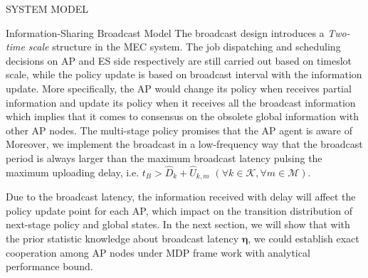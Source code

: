 \documentclass[10pt, conference, letterpaper]{IEEEtran}
\newcommand{\vecG}{\boldsymbol}
\newcommand{\apSet}{\mathcal{K}}
\newcommand{\esSet}{\mathcal{M}}
\begin{document}
\begin{section}{SYSTEM MODEL}
\begin{subsection}{Information-Sharing Broadcast Model}
            The broadcast design introduces a \emph{Two-time scale} structure in the MEC system.
            The job dispatching and scheduling decisions on AP and ES side respectively are still carried out based on timeslot scale, while the policy update is based on broadcast interval with the information update.
            More specifically, the AP would change its policy when receives partial information and update its policy when it receives all the broadcast information which implies that it comes to consensus on the obsolete global information with other AP nodes.
            {\color{red}The multi-stage policy promises that the AP agent is aware of  Moreover, we implement the broadcast in a low-frequency way that the broadcast period is always larger than the maximum broadcast latency pulsing the maximum uploading delay, i.e. $t_B > \hat{D}_{k} + \hat{U}_{k,m}$ $(\forall k\in\apSet, \forall m\in\esSet)$.}

            Due to the broadcast latency, the information received with delay will affect the policy update point for each AP, which impact on the transition distribution of next-stage policy and global states.
            {\color{red}In the next section, we will show that with the prior statistic knowledge about broadcast latency $\vecG{\eta}$, we could establish exact cooperation among AP nodes under MDP frame work with analytical performance bound.}
        \end{subsection}
    \end{section}
\end{document}
